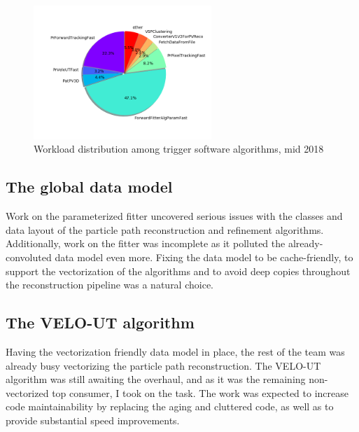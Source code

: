 \documentclass[12pt]{article}
\begin{document}
\begin{figure}[H]
	\begin{center}
		\includegraphics[width=0.6\textwidth]{algo_usage_original_bestphys}
	\end{center}
	\caption{Workload distribution among trigger software algorithms, mid 2018}
	\label{fig_algo_usage_choice}
\end{figure}


\subsection{The global data model}

Work on the parameterized fitter uncovered serious issues with the classes and data layout of the particle path reconstruction and refinement algorithms. Additionally, work on the fitter was incomplete as it polluted the already-convoluted data model even more. Fixing the data model to be cache-friendly, to support the vectorization of the algorithms and to avoid deep copies throughout the reconstruction pipeline was a natural choice.


\subsection{The VELO-UT algorithm}

Having the vectorization friendly data model in place, the rest of the team was already busy vectorizing the particle path reconstruction. The VELO-UT algorithm was still awaiting the overhaul, and as it was the remaining non-vectorized top consumer, I took on the task. The work was expected to increase code maintainability by replacing the aging and cluttered code, as well as to provide substantial speed improvements.


\newpage
\end{document}

